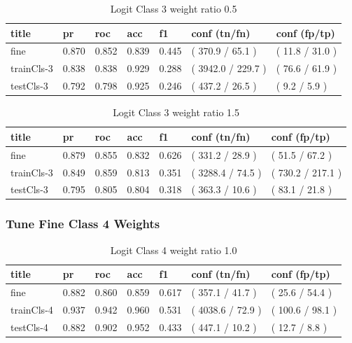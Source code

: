 \documentclass[ms]{nuthesis}
\begin{document}
\FloatBarrier
\begin{table}[H]
\centering
\caption{Logit Class 3 weight ratio 0.5}
\label{tab:LogRegCls3-Wtp5}
\begin{tabular}{|l||l||l||l||l||l||l|}\toprule
title & pr & roc & acc & f1 & conf (tn/fn) & conf (fp/tp) \\ \midrule
fine & 0.870 & 0.852 & 0.839 & 0.445 & ( 370.9 / 65.1 ) & ( 11.8 / 31.0 ) \\
trainCls-3 & 0.838 & 0.838 & 0.929 & 0.288 & ( 3942.0 / 229.7 ) & ( 76.6 / 61.9 ) \\
testCls-3 & 0.792 & 0.798 & 0.925 & 0.246 & ( 437.2 / 26.5 ) & ( 9.2 / 5.9 ) \\ \bottomrule
\end{tabular}
\end{table}
\FloatBarrier

\FloatBarrier
\begin{table}[H]
\centering
\caption{Logit Class 3 weight ratio 1.5}
\label{tab:LogRegCls3-Wt1p5}
\begin{tabular}{|l||l||l||l||l||l||l|}\toprule
title & pr & roc & acc & f1 & conf (tn/fn) & conf (fp/tp) \\ \midrule
fine & 0.879 & 0.855 & 0.832 & 0.626 & ( 331.2 / 28.9 ) & ( 51.5 / 67.2 ) \\
trainCls-3 & 0.849 & 0.859 & 0.813 & 0.351 & ( 3288.4 / 74.5 ) & ( 730.2 / 217.1 ) \\
testCls-3 & 0.795 & 0.805 & 0.804 & 0.318 & ( 363.3 / 10.6 ) & ( 83.1 / 21.8 ) \\ \bottomrule
\end{tabular}
\end{table}
\FloatBarrier


\subsubsection{Tune Fine Class 4 Weights}
\FloatBarrier
\begin{table}[H]
\centering
\caption{Logit Class 4 weight ratio 1.0}
\label{tab:LogRegCls4-Wt1}
\begin{tabular}{|l||l||l||l||l||l||l|}\toprule
title & pr & roc & acc & f1 & conf (tn/fn) & conf (fp/tp) \\ \midrule
fine & 0.882 & 0.860 & 0.859 & 0.617 & ( 357.1 / 41.7 ) & ( 25.6 / 54.4 ) \\
trainCls-4 & 0.937 & 0.942 & 0.960 & 0.531 & ( 4038.6 / 72.9 ) & ( 100.6 / 98.1 ) \\
testCls-4 & 0.882 & 0.902 & 0.952 & 0.433 & ( 447.1 / 10.2 ) & ( 12.7 / 8.8 ) \\ \bottomrule
\end{tabular}
\end{table}
\FloatBarrier
\end{document}
